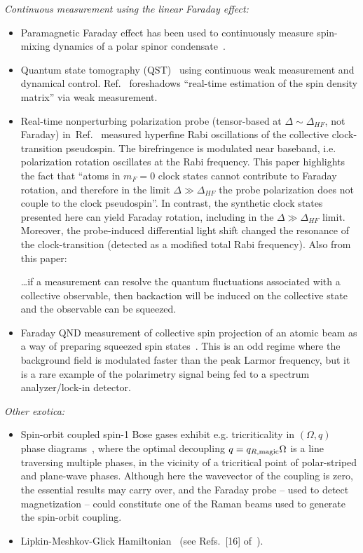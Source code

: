 \documentclass[aps,prl,reprint,superscriptaddress,floatfix]{revtex4-1}
\begin{document}
\emph{Continuous measurement using the linear Faraday effect:}
\begin{itemize}
    \item Paramagnetic Faraday effect has been used to continuously measure spin-mixing dynamics of a polar spinor condensate~\cite{liu_quantum_2009}.
    \item Quantum state tomography (QST)~\cite{smith_continuous_2004,*smith_efficient_2006} using continuous weak measurement and dynamical control.
    Ref.~\cite[2004]{smith_continuous_2004} foreshadows ``real-time estimation of the spin density matrix'' via weak measurement.
    \item Real-time nonperturbing polarization probe (tensor-based at $\Delta \sim \Delta_{HF}$, not Faraday) in~Ref.~\cite{chaudhury_continuous_2006} measured hyperfine Rabi oscillations of the collective clock-transition pseudospin.
    The birefringence is modulated near baseband, i.e. polarization rotation oscillates at the Rabi frequency.
    This paper highlights the fact that ``atoms in $m_F=0$ clock states cannot contribute to Faraday rotation, and therefore in the limit $\Delta \gg \Delta_{HF}$ the probe polarization does not couple to the clock pseudospin''.
    In contrast, the synthetic clock states presented here can yield Faraday rotation, including in the $\Delta \gg \Delta_{HF}$ limit.
    Moreover, the probe-induced differential light shift changed the resonance of the clock-transition (detected as a modified total Rabi frequency).
    Also from this paper:
    \begin{quoting}
        \dots if a measurement can resolve the quantum fluctuations associated with a collective observable, then backaction will be induced on the collective state and the observable can be squeezed.
    \end{quoting}
    \item Faraday QND measurement of collective spin projection of an atomic beam as a way of preparing squeezed spin states~\cite{kuzmich_quantum_1999,*kuzmich_generation_2000}.
    This is an odd regime where the background field is modulated faster than the peak Larmor frequency, but it is a rare example of the polarimetry signal being fed to a spectrum analyzer/lock-in detector.
\end{itemize}
\emph{Other exotica:}
\begin{itemize}
    \item Spin-orbit coupled spin-1 Bose gases exhibit e.g. tricriticality in $(\Omega, q)$ phase diagrams~\cite{martone_tricriticalities_2016}, where the optimal decoupling $q = q_{R,\text{magic}} \Omega$ is a line traversing multiple phases, in the vicinity of a tricritical point of polar-striped and plane-wave phases. Although here the wavevector of the coupling is zero, the essential results may carry over, and the Faraday probe -- used to detect magnetization -- could constitute one of the Raman beams used to generate the spin-orbit coupling.
    \item Lipkin-Meshkov-Glick Hamiltonian~\cite{lipkin_validity_1965} (see Refs.~[16] of~\cite{muessel_twist-and-turn_2015}). 
\end{itemize}
\end{document}
